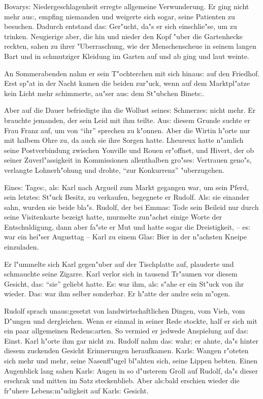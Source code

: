 \documentclass[oneside,12pt]{book}
\newcommand{\s}{s:}%
\begin{document}
Bovary{\s} Niedergeschlagenheit erregte allgemeine Verwunderung.
Er ging nicht mehr au{\s}, empfing niemanden und weigerte sich
sogar, seine Patienten zu besuchen. Dadurch entstand da{\s}
Ger"ucht, da"s er sich einschlie"se, um zu trinken. Neugierige
aber, die hin und nieder den Kopf "uber die Gartenhecke reckten,
sahen zu ihrer "Uberraschung, wie der Menschenscheue in seinem
langen Bart und in schmutziger Kleidung im Garten auf und ab ging
und laut weinte.

An Sommerabenden nahm er sein T"ochterchen mit sich hinau{\s} auf
den Friedhof. Erst sp"at in der Nacht kamen die beiden zur"uck,
wenn auf dem Marktpl"atze kein Licht mehr schimmerte, au"ser
au{\s} dem St"ubchen Binet{\s}.

Aber auf die Dauer befriedigte ihn die Wollust seine{\s}
Schmerze{\s} nicht mehr. Er brauchte jemanden, der sein Leid mit
ihm teilte. Au{\s} diesem Grunde suchte er Frau Franz auf, um von
"`ihr"' sprechen zu k"onnen. Aber die Wirtin h"orte nur mit halbem
Ohre zu, da auch sie ihre Sorgen hatte. Lheureux hatte n"amlich
seine Postverbindung zwischen Yonville und Rouen er"offnet, und
Hivert, der ob seiner Zuverl"assigkeit in Kommissionen
allenthalben gro"se{\s} Vertrauen geno"s, verlangte Lohnerh"ohung
und drohte, "`zur Konkurrenz"' "uberzugehen.

Eine{\s} Tage{\s}, al{\s} Karl nach Argueil zum Markt gegangen
war, um sein Pferd, sein letzte{\s} St"uck Besitz, zu verkaufen,
begegnete er Rudolf. Al{\s} sie einander sahn, wurden sie beide
bla"s. Rudolf, der bei Emma{\s} Tode sein Beileid nur durch seine
Visitenkarte bezeigt hatte, murmelte zun"achst einige Worte der
Entschuldigung, dann aber fa"ste er Mut und hatte sogar die
Dreistigkeit, -- e{\s} war ein hei"ser Augusttag -- Karl zu einem
Gla{\s} Bier in der n"achsten Kneipe einzuladen.

Er l"ummelte sich Karl gegen"uber auf der Tischplatte auf,
plauderte und schmauchte seine Zigarre. Karl verlor sich in
tausend Tr"aumen vor diesem Gesicht, da{\s} "`sie"' geliebt hatte.
E{\s} war ihm, al{\s} s"ahe er ein St"uck von ihr wieder. Da{\s}
war ihm selber sonderbar. Er h"atte der andre sein m"ogen.

Rudolf sprach unau{\s}gesetzt von landwirtschaftlichen Dingen, vom
Vieh, vom D"ungen und dergleichen. Wenn er einmal in seiner Rede
stockte, half er sich mit ein paar allgemeinen Reden{\s}arten. So
vermied er jedwede Anspielung auf da{\s} Einst. Karl h"orte ihm
gar nicht zu. Rudolf nahm da{\s} wahr; er ahnte, da"s hinter
diesem zuckenden Gesicht Erinnerungen heraufkamen. Karl{\s} Wangen
r"oteten sich mehr und mehr, seine Nasenfl"ugel bl"ahten sich,
seine Lippen bebten. Einen Augenblick lang sahen Karl{\s} Augen in
so d"usterem Groll auf Rudolf, da"s dieser erschrak und mitten im
Satz steckenblieb. Aber al{\s}bald erschien wieder die fr"uhere
Leben{\s}m"udigkeit auf Karl{\s} Gesicht.
\end{document}
